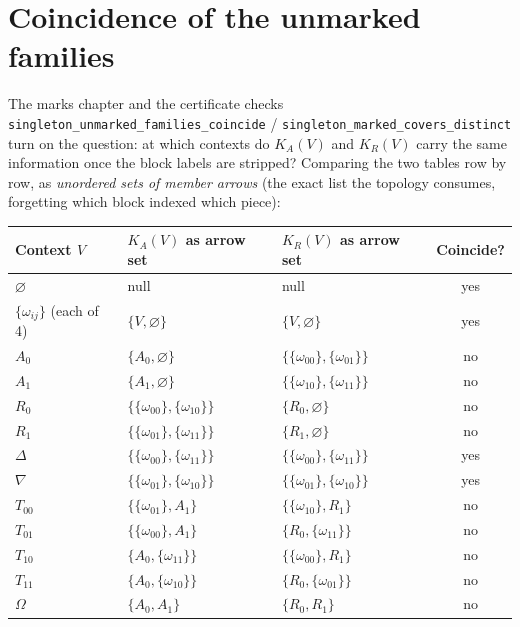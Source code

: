\section{Coincidence of the unmarked families}
\label{appA:sec:coincide}

The marks chapter and the certificate checks
\texttt{singleton\_unmarked\_families\_coincide} /
\texttt{singleton\_marked\_covers\_distinct} turn on the question: at
which contexts do $K_A(V)$ and $K_R(V)$ carry the same information once
the block labels are stripped? Comparing the two tables row by row, as
\emph{unordered sets of member arrows} (the exact list the topology
consumes, forgetting which block indexed which piece):

\begin{longtable}{@{}lllc@{}}
\toprule
Context $V$ & $K_A(V)$ as arrow set & $K_R(V)$ as arrow set &
Coincide? \\
\midrule
\endhead
\bottomrule
\endfoot
$\varnothing$ & null & null & yes \\
$\{\omega_{ij}\}$ (each of 4) & $\{V, \varnothing\}$ &
$\{V, \varnothing\}$ & yes \\
$A_0$ & $\{A_0, \varnothing\}$ &
$\{\{\omega_{00}\}, \{\omega_{01}\}\}$ & no \\
$A_1$ & $\{A_1, \varnothing\}$ &
$\{\{\omega_{10}\}, \{\omega_{11}\}\}$ & no \\
$R_0$ & $\{\{\omega_{00}\}, \{\omega_{10}\}\}$ &
$\{R_0, \varnothing\}$ & no \\
$R_1$ & $\{\{\omega_{01}\}, \{\omega_{11}\}\}$ &
$\{R_1, \varnothing\}$ & no \\
$\Delta$ & $\{\{\omega_{00}\}, \{\omega_{11}\}\}$ &
$\{\{\omega_{00}\}, \{\omega_{11}\}\}$ & yes \\
$\nabla$ & $\{\{\omega_{01}\}, \{\omega_{10}\}\}$ &
$\{\{\omega_{01}\}, \{\omega_{10}\}\}$ & yes \\
$T_{00}$ & $\{\{\omega_{01}\}, A_1\}$ & $\{\{\omega_{10}\}, R_1\}$ & no \\
$T_{01}$ & $\{\{\omega_{00}\}, A_1\}$ & $\{R_0, \{\omega_{11}\}\}$ & no \\
$T_{10}$ & $\{A_0, \{\omega_{11}\}\}$ & $\{\{\omega_{00}\}, R_1\}$ & no \\
$T_{11}$ & $\{A_0, \{\omega_{10}\}\}$ & $\{R_0, \{\omega_{01}\}\}$ & no \\
$\Omega$ & $\{A_0, A_1\}$ & $\{R_0, R_1\}$ & no \\
\end{longtable}

